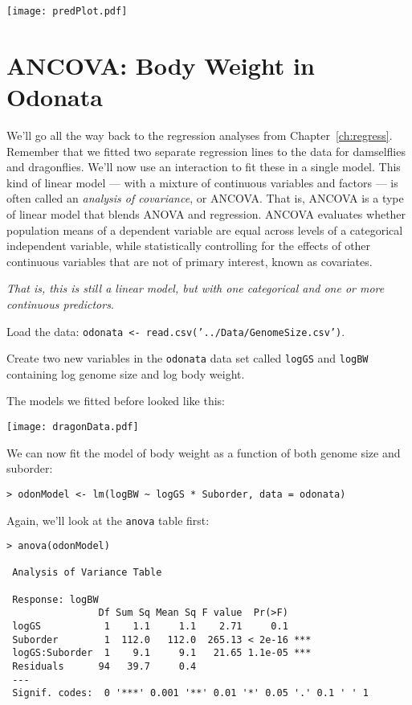 \begin{center}
	\texttt{[image: predPlot.pdf]} 
\end{center} 

\section{ANCOVA: Body Weight in Odonata}

We'll go all the way back to the regression analyses from 
Chapter~\ref{ch:regress}. Remember that we fitted two separate 
regression lines to the data for damselflies and dragonflies. We'll now 
use an interaction to fit these in a single model. This kind of linear 
model --- with a mixture of continuous variables and factors --- is 
often called an {\it analysis of covariance}, or ANCOVA. That is, 
ANCOVA is a type of linear model that blends ANOVA and regression. 
ANCOVA evaluates whether population means of a dependent variable are 
equal across levels of a categorical independent variable, while 
statistically controlling for the effects of other continuous variables 
that are not of primary interest, known as covariates. 

{\it That is, this is still a linear model, but with one categorical and one or more continuous predictors}.

\begin{compactitem}[$\quad\star$]
	\item Load the data: {\tt odonata <- read.csv('../Data/GenomeSize.csv')}.
	\item Create two new variables in the {\tt odonata} data set called 
	{\tt logGS} and {\tt logBW} containing log genome size and log body 
	weight.
\end{compactitem}

The models we fitted before looked like this:

\begin{center}
	\texttt{[image: dragonData.pdf]} 
\end{center} 

We can now fit the model of body weight as a function of both genome 
size and suborder:

\begin{lstlisting}
> odonModel <- lm(logBW ~ logGS * Suborder, data = odonata)
\end{lstlisting}

Again, we'll look at the {\tt anova} table first:

\begin{lstlisting}
> anova(odonModel)
 
 Analysis of Variance Table
 
 Response: logBW
                Df Sum Sq Mean Sq F value  Pr(>F)    
 logGS           1    1.1     1.1    2.71     0.1    
 Suborder        1  112.0   112.0  265.13 < 2e-16 ***
 logGS:Suborder  1    9.1     9.1   21.65 1.1e-05 ***
 Residuals      94   39.7     0.4                    
 ---
 Signif. codes:  0 '***' 0.001 '**' 0.01 '*' 0.05 '.' 0.1 ' ' 1 
\end{lstlisting}


